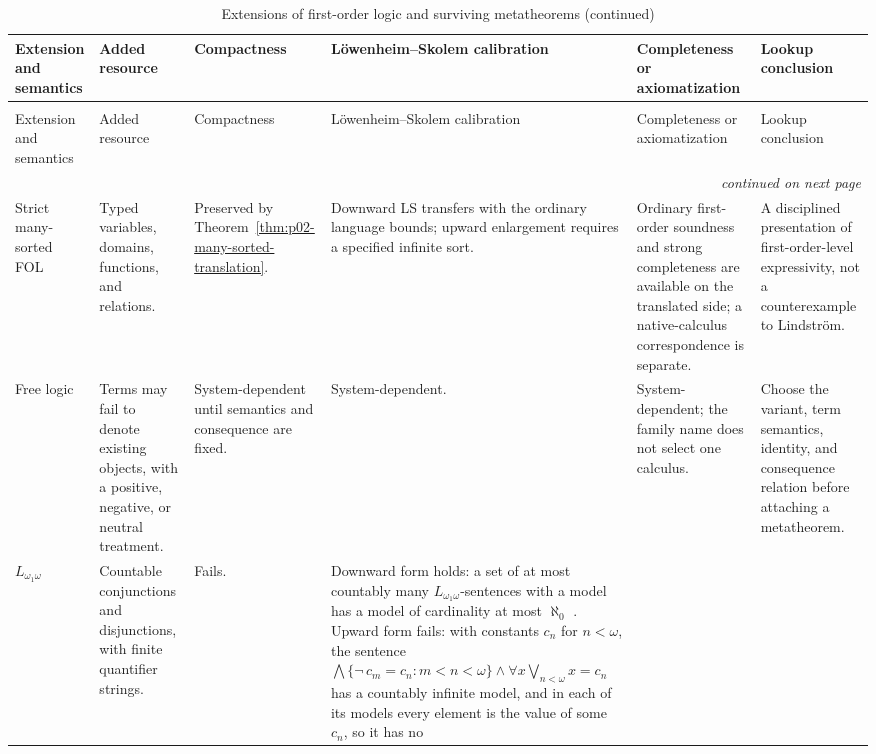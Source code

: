 \begin{landscape}
\begingroup\tiny\setlength{\tabcolsep}{2pt}
\begin{longtable}{@{}p{.85in}p{1.25in}p{.80in}p{1.05in}p{1.55in}p{1.55in}@{}}
\caption{Extensions of first-order logic and surviving metatheorems.}
\label{tab:p02-fol-extensions}\\
\toprule
Extension and semantics & Added resource & Compactness & L\"owenheim--Skolem calibration & Completeness or axiomatization & Lookup conclusion \\ \midrule
\endfirsthead
\caption[]{Extensions of first-order logic and surviving metatheorems (continued)}\\
\toprule
Extension and semantics & Added resource & Compactness & L\"owenheim--Skolem calibration & Completeness or axiomatization & Lookup conclusion \\ \midrule
\endhead
\midrule\multicolumn{6}{r}{\emph{continued on next page}}\\
\endfoot
\endlastfoot
Strict many-sorted FOL &
Typed variables, domains, functions, and relations. &
Preserved by Theorem~\ref{thm:p02-many-sorted-translation}. &
Downward LS transfers with the ordinary language bounds; upward enlargement
requires a specified infinite sort. &
Ordinary first-order soundness and strong completeness are available on the
translated side; a native-calculus correspondence is separate. &
A disciplined presentation of first-order-level expressivity, not a
counterexample to Lindstr\"om. \\
\addlinespace
Free logic &
Terms may fail to denote existing objects, with a positive, negative, or
neutral treatment. &
System-dependent until semantics and consequence are fixed. &
System-dependent. &
System-dependent; the family name does not select one calculus. &
Choose the variant, term semantics, identity, and consequence relation before
attaching a metatheorem. \\
\addlinespace
\(L_{\omega_1\omega}\) &
Countable conjunctions and disjunctions, with finite quantifier strings. &
Fails. &
Downward form holds: a set of at most countably many
\(L_{\omega_1\omega}\)-sentences with a model has a model of cardinality at
most \(\aleph_0\)
\cite[ch.~A.1, Theorem~2.5 on p.~10 and \S5.6 on p.~45]{Barwise1977FirstOrder}.
Upward form fails: with constants \(c_n\) for \(n<\omega\), the sentence
\(\bigwedge\{\neg\,c_m=c_n:m<n<\omega\}\land
\forall x\bigvee_{n<\omega}x=c_n\) has a countably infinite model, and in
each of its models every element is the value of some \(c_n\), so it has no

\end{longtable}
\end{landscape}
